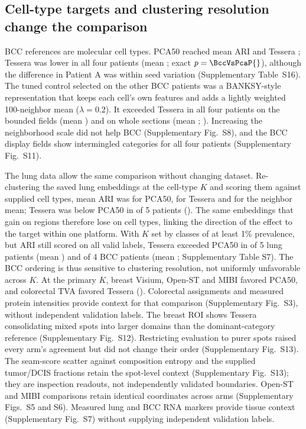 \subsection{Cell-type targets and clustering resolution change the comparison}
BCC references are molecular cell types. PCA50 reached mean ARI \BccPca{} and Tessera \BccFull{}; Tessera was lower in all four patients (mean \BccDelta{}; exact \(p=\BccVsPcaP{}\)), although the difference in Patient A was within seed variation (Supplementary Table~S16). The tuned control selected on the other BCC patients was a BANKSY-style representation that keeps each cell's own features and adds a lightly weighted 100-neighbor mean (\(\lambda=0.2\)). It exceeded Tessera in all four patients on the bounded fields (mean \BccNestedDelta{}) and on whole sections (mean \BccWholeVsControlMean{}; ). Increasing the neighborhood scale did not help BCC (Supplementary Fig.~S8), and the BCC display fields show intermingled categories for all four patients (Supplementary Fig.~S11).

The lung data allow the same comparison without changing dataset. Re-clustering the saved lung embeddings at the cell-type \(K\) and scoring them against supplied cell types, mean ARI was \CellTypePca{} for PCA50, \CellTypeTessera{} for Tessera and \CellTypeMean{} for the neighbor mean; Tessera was below PCA50 in \CellTypeTesseraLower{} of 5 patients (). The same embeddings that gain on regions therefore lose on cell types, linking the direction of the effect to the target within one platform. With \(K\) set by classes of at least 1\% prevalence, but ARI still scored on all valid labels, Tessera exceeded PCA50 in \LungCommonKBetter{} of 5 lung patients (mean \LungCommonKDelta{}) and \BccCommonKBetter{} of 4 BCC patients (mean \BccCommonKDelta{}; Supplementary Table S7). The BCC ordering is thus sensitive to clustering resolution, not uniformly unfavorable across \(K\). At the primary \(K\), breast Visium, Open-ST and MIBI favored PCA50, and colorectal TVA favored Tessera (). Colorectal assignments and measured protein intensities provide context for that comparison (Supplementary Fig.~S3), without independent validation labels. The breast ROI shows Tessera consolidating mixed spots into larger domains than the dominant-category reference (Supplementary Fig.~S12). Restricting evaluation to purer spots raised every arm's agreement but did not change their order (Supplementary Fig.~S13). The seam-score scatter against composition entropy and the supplied tumor/DCIS fractions retain the spot-level context (Supplementary Fig.~S13); they are inspection readouts, not independently validated boundaries. Open-ST and MIBI comparisons retain identical coordinates across arms (Supplementary Figs.~S5 and S6). Measured lung and BCC RNA markers provide tissue context (Supplementary Fig.~S7) without supplying independent validation labels.









